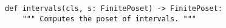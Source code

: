 \begin{verbatim}
def intervals(cls, s: FinitePoset) -> FinitePoset:
    """ Computes the poset of intervals. """
\end{verbatim}